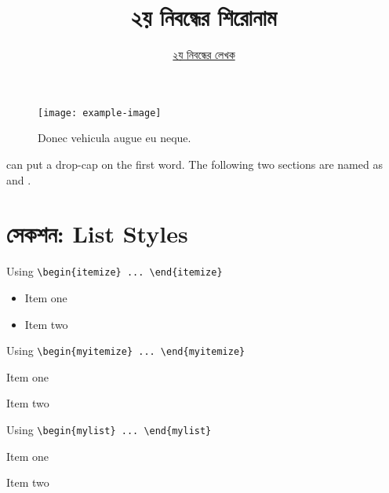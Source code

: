 \documentclass[12pt]{article}
\begin{document}

\title{২য় নিবন্ধের শিরোনাম}
\author{\href{https://github.com/rafisics/ebook-template}{২য় নিবন্ধের লেখক}}
\date{}


\begin{figure}[htbp]
        \centering
        \texttt{[image: example-image]}
        \caption{Donec vehicula augue eu neque.}
\end{figure}

 can put a drop-cap on the first word. \blindtext The following two sections are named as  and .\\

\section*{সেকশন: List Styles}  \label{sec:list}

Using \verb|\begin{itemize} ... \end{itemize}|
\begin{itemize}
        \item Item one
        \item Item two
\end{itemize}

Using \verb|\begin{myitemize} ... \end{myitemize}|
\begin{myitemize}
        \item Item one
        \item Item two
\end{myitemize}

Using \verb|\begin{mylist} ... \end{mylist}|
\begin{mylist}
        \item Item one
        \item Item two
\end{mylist}
\end{document}
